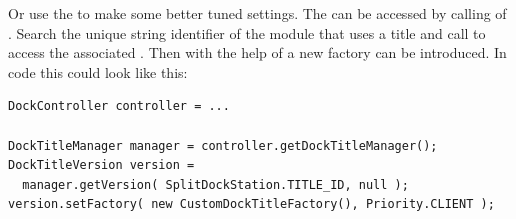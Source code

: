 Or use the  to make some better tuned settings. The \linebreak {} can be accessed by calling  of \linebreak {}. Search the unique string identifier of the module that uses a title and call  to access the associated . Then with the help of  a new factory can be introduced. In code this could look like this:
\begin{lstlisting}
DockController controller = ...

DockTitleManager manager = controller.getDockTitleManager();
DockTitleVersion version =
  manager.getVersion( SplitDockStation.TITLE_ID, null );
version.setFactory( new CustomDockTitleFactory(), Priority.CLIENT );
\end{lstlisting}
